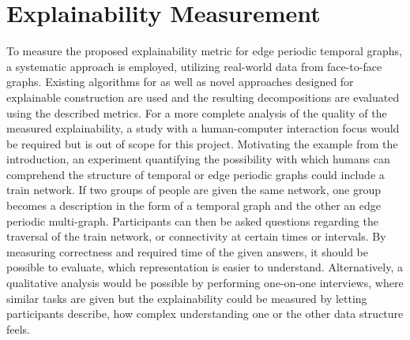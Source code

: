 \section{Explainability Measurement}
\label{ch:explainability:measurement}
To measure the proposed explainability metric for edge periodic temporal graphs, a systematic approach is employed, utilizing real-world data from face-to-face graphs.
Existing algorithms for \DFA \andDecomp as well as novel approaches designed for explainable \orDecomp construction are used and the resulting decompositions are evaluated using the described metrics.
For a more complete analysis of the quality of the measured explainability, a study with a human-computer interaction focus would be required but is out of scope for this project.
Motivating the example from the introduction, an experiment quantifying the possibility with which humans can comprehend the structure of temporal or edge periodic graphs could include a train network. 
If two groups of people are given the same network, one group becomes a description in the form of a temporal graph and the other an edge periodic multi-graph.
Participants can then be asked questions regarding the traversal of the train network, or connectivity at certain times or intervals.
By measuring correctness and required time of the given answers, it should be possible to evaluate, which representation is easier to understand.  
Alternatively, a qualitative analysis would be possible by performing one-on-one interviews, where similar tasks are given but the explainability could be measured by letting participants describe, how complex understanding one or the other data structure feels.

